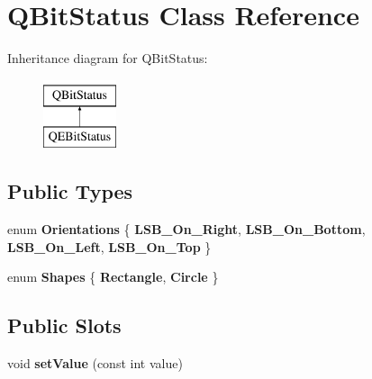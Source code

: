 \hypertarget{classQBitStatus}{
\section{QBitStatus Class Reference}
\label{classQBitStatus}
}
Inheritance diagram for QBitStatus:\begin{figure}[H]
\begin{center}
\leavevmode
\includegraphics[height=2.000000cm]{classQBitStatus}
\end{center}
\end{figure}
\subsection*{Public Types}
\begin{DoxyCompactItemize}
\item 
enum {\bfseries Orientations} \{ {\bfseries LSB\_\-On\_\-Right}, 
{\bfseries LSB\_\-On\_\-Bottom}, 
{\bfseries LSB\_\-On\_\-Left}, 
{\bfseries LSB\_\-On\_\-Top}
 \}
\item 
enum {\bfseries Shapes} \{ {\bfseries Rectangle}, 
{\bfseries Circle}
 \}
\end{DoxyCompactItemize}
\subsection*{Public Slots}
\begin{DoxyCompactItemize}
\item 
\hypertarget{classQBitStatus_a0ce4f4b37fda18ebeafdc532f8a28bb5}{
void {\bfseries setValue} (const int value)}
\label{classQBitStatus_a0ce4f4b37fda18ebeafdc532f8a28bb5}

\end{DoxyCompactItemize}
